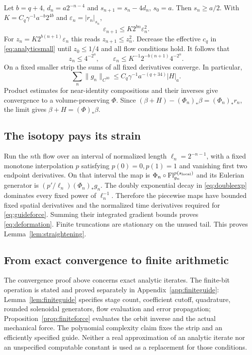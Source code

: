 \documentclass[11pt,a4paper]{amsart}
\theoremstyle{definition}
\theoremstyle{remark}
\numberwithin{equation}{section}
\newcommand{\norm}[1]{\lVert #1\rVert}
\newcommand{\Flow}{\operatorname{Fl}}
\newcommand{\push}[1]{(#1)_*}
\begin{document}
Let $b=q+4$, $d_n=a2^{-n-4}$ and $s_{n+1}=s_n-4d_n$, $s_0=a$. Then $s_n\ge a/2$. With
$K=C_q\gamma^{-1}a^{-b}2^{4b}$ and $\varepsilon_n=|r_n|_{s_n}$,
\[
 \varepsilon_{n+1}\le K2^{bn}\varepsilon_n^2.
\]
For $z_n=K2^{b(n+1)}\varepsilon_n$ this reads $z_{n+1}\le z_n^2$. Decrease the effective $c_q$ in \eqref{eq:analyticsmall} until $z_0\le1/4$ and all flow conditions hold. It follows that
\begin{equation}\label{eq:doubleexp}
 z_n\le4^{-2^n},\qquad
 \varepsilon_n\le K^{-1}2^{-b(n+1)}4^{-2^n}.
\end{equation}
On a fixed smaller strip the sums of all fixed derivatives converge. In particular,
\[
 \sum_n\norm{g_n}_{C^{30}}
 \le C_q\gamma^{-1}a^{-(q+34)}|H|_a.
\]
Product estimates for near-identity compositions and their inverses give convergence to a volume-preserving $\Phi$. Since
$(\beta+H)-\push{\Phi_n}\beta=\push{\Phi_n}r_n$, the limit gives $\beta+H=\push\Phi\beta$.

\subsection{The isotopy pays its strain}
Run the $n$th flow over an interval of normalized length $\ell_n=2^{-n-1}$, with a fixed monotone interpolation $p$ satisfying $p(0)=0,p(1)=1$ and vanishing first two endpoint derivatives. On that interval the map is
$\Phi_n\circ\Flow_{g_n}^{p(s_{\rm local})}$ and its Eulerian generator is
$(p'/\ell_n)\push{\Phi_n}g_n$. The doubly exponential decay in \eqref{eq:doubleexp} dominates every fixed power of $\ell_n^{-1}$. Therefore the piecewise maps have bounded fixed spatial derivatives and the normalized time derivatives required for \eqref{eq:guideforce}. Summing their integrated gradient bounds proves \eqref{eq:deformation}. Finite truncations are stationary on the unused tail. This proves Lemma~\ref{lem:straightening}.

\subsection{From exact convergence to finite arithmetic}
The convergence proof above concerns exact analytic iterates. The finite-bit operation is stated and proved separately in Appendix~\ref{app:finiteguide}: Lemma~\ref{lem:finiteguide} specifies stage count, coefficient cutoff, quadrature, rounded solenoidal generators, flow evaluation and error propagation; Proposition~\ref{prop:finiteforce} evaluates the orbit inverse and the actual mechanical force. The polynomial complexity claim fixes the strip and an efficiently specified guide. Neither a real approximation of an analytic iterate nor an unspecified computable constant is used as a replacement for those conditions.
\end{document}
